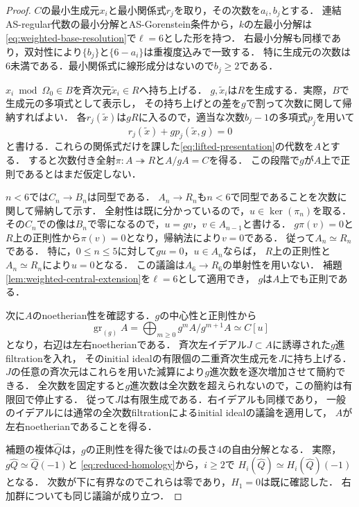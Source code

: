 \documentclass[11pt,a4paper]{ltjsarticle}
\theoremstyle{definition}
\begin{document}
\begin{proof}
$C$の最小生成元$x_i$と最小関係式$r_j$を取り，その次数を$a_i,b_j$とする．
連結AS-regular代数の最小分解とAS-Gorenstein条件から，$k$の左最小分解は
\eqref{eq:weighted-base-resolution}で$\ell=6$とした形を持つ．
右最小分解も同様であり，双対性により$\{b_j\}$と$\{6-a_i\}$は重複度込みで一致する．
特に生成元の次数は6未満である．最小関係式に線形成分はないので$b_j\geq2$である．

$x_i\bmod\Omega_0\in B$を斉次元$\widetilde x_i\in R$へ持ち上げる．
$g,\widetilde x_i$は$R$を生成する．実際，$B$で生成元の多項式として表示し，
その持ち上げとの差を$g$で割って次数に関して帰納すればよい．
各$r_j(\widetilde x)$は$gR$に入るので，適当な次数$b_j-1$の多項式$p_j$を用いて
\[
 r_j(\widetilde x)+g p_j(\widetilde x,g)=0
\]
と書ける．これらの関係式だけを課した\eqref{eq:lifted-presentation}の代数を$A$とする．
すると次数付き全射$\pi:A\twoheadrightarrow R$と$A/gA=C$を得る．
この段階で$g$が$A$上で正則であるとはまだ仮定しない．

$n<6$では$C_n\to B_n$は同型である．
$A_n\to R_n$も$n<6$で同型であることを次数に関して帰納して示す．
全射性は既に分かっているので，$u\in\ker(\pi_n)$を取る．
その$C_n$での像は$B_n$で零になるので，$u=gv$，$v\in A_{n-1}$と書ける．
$g\pi(v)=0$と$R$上の正則性から$\pi(v)=0$となり，帰納法により$v=0$である．
従って$A_n\simeq R_n$である．
特に，$0\leq n\leq5$に対して$gu=0$，$u\in A_n$ならば，
$R$上の正則性と$A_n\simeq R_n$により$u=0$となる．
この議論は$A_6\to R_6$の単射性を用いない．
補題\ref{lem:weighted-central-extension}を$\ell=6$として適用でき，
$g$は$A$上でも正則である．

次に$A$のnoetherian性を確認する．$g$の中心性と正則性から
\[
 \operatorname{gr}_{(g)}A
 =\bigoplus_{m\geq0}g^mA/g^{m+1}A\simeq C[u]
\]
となり，右辺は左右noetherianである．
斉次左イデアル$J\subset A$に誘導された$g$進filtrationを入れ，
そのinitial idealの有限個の二重斉次生成元を$J$に持ち上げる．
$J$の任意の斉次元はこれらを用いた減算により$g$進次数を逐次増加させて簡約できる．
全次数を固定すると$g$進次数は全次数を超えられないので，この簡約は有限回で停止する．
従って$J$は有限生成である．右イデアルも同様であり，
一般のイデアルには通常の全次数filtrationによるinitial idealの議論を適用して，
$A$が左右noetherianであることを得る．

補題の複体$\widehat Q$は，$g$の正則性を得た後では$k$の長さ4の自由分解となる．
実際，$g\widehat Q\simeq\widehat Q(-1)$と
\eqref{eq:reduced-homology}から，$i\geq2$で
$H_i(\widehat Q)\simeq H_i(\widehat Q)(-1)$となる．
次数が下に有界なのでこれらは零であり，$H_1=0$は既に確認した．
右加群についても同じ議論が成り立つ．


\end{proof}
\end{document}
